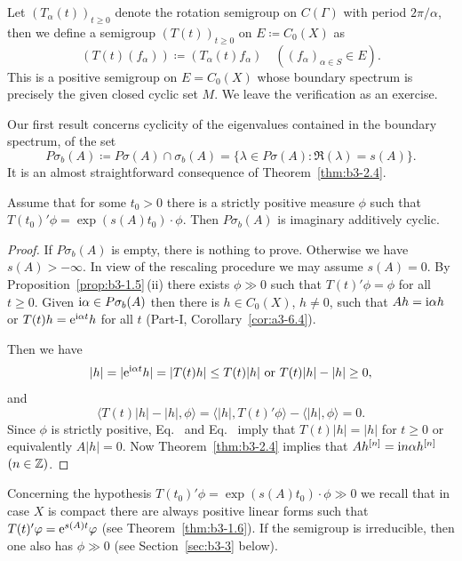 \begin{examples}
\begin{enumerate}[\upshape (i), wide, labelindent=.25em]
Let $(T_{\alpha}(t))_{t \geq 0}$ denote the rotation semigroup on $C(\Gamma)$ with period $2\pi/\alpha$, then we define a semigroup $(T(t))_{t \geq 0}$ on $E \coloneq C_{0}(X)$ as
	\[
	(T(t)(f_{\alpha})) \coloneq (T_{\alpha}(t)f_{\alpha}) \quad ((f_{\alpha})_{\alpha \in S} \in E).
	\]
	This is a positive semigroup on $E = C_{0}(X)$ whose boundary spectrum is precisely the given closed cyclic set $M$.
	We leave the verification as an exercise.
	
\end{enumerate}
\end{examples}
Our first result concerns cyclicity of the eigenvalues contained in the boundary spectrum, \ie of the set
	\[
	P\sigma_{b}(A) \coloneq P\sigma(A) \cap \sigma_{b}(A) = \{\lambda \in P\sigma(A) \colon \Re(\lambda)  = s(A)\}.
	\]
	It is an almost straightforward consequence of Theorem~\ref{thm:b3-2.4}.
	\begin{proposition}\label{prop:b3-2.7}
		
		Assume that for some $t_{0} > 0$ there is a strictly positive measure $\phi$ such that $T(t_{0})'\phi = \exp(s(A)t_{0})\cdot\phi$.
		Then $P\sigma_{b}(A)$ is imaginary additively cyclic.
	\end{proposition}
\begin{proof}
If\/ $P\sigma_{b}(A)$ is empty, there is nothing to prove.
Otherwise we have $s(A) > -\infty$.
In view of the rescaling procedure we may assume $s(A) = 0$.
By Proposition~\ref{prop:b3-1.5}\,(ii) there exists $\phi \gg 0$ such that $T(t)'\phi = \phi$ for all $t \geq 0$.
Given $\mathrm{i} \alpha \in P\sigma_{b}(A)$ then there is $h \in C_{0}(X)$, $h \neq 0$, such that $Ah = \mathrm{i}\alpha h$ or $T(t)h = \mathrm{e}^{\mathrm{i}\alpha t}h$ for all $t$ (Part-I, Corollary~\ref{cor:a3-6.4}).

	Then we have
	\begin{equation}\label{eq:b3-2.14}
		|h| = |\eu^{\im\alpha t}h| = |T(t)h| \leq T(t)|h| \text{ or } T(t)|h| - |h| \geq 0,
	\end{equation}
	and
	\begin{equation}\label{eq:b3-2.15}
		\langle T(t)|h| - |h|,\phi \rangle = \langle |h|,T(t)'\phi \rangle - \langle |h|,\phi \rangle = 0.
	\end{equation}
	Since $\phi$ is strictly positive, Eq.~  and Eq.~ imply that $T(t)|h| = |h|$ for $t \geq 0$ or equivalently $A|h| = 0$.
	Now Theorem~\ref{thm:b3-2.4} implies that $Ah^{[n]} = \mathrm{i} n\alpha h^{[n]}$ $(n \in \mathbb{Z})$.
\end{proof}
Concerning the hypothesis $T(t_{0})'\phi = \exp(s(A)t_{0})\cdot\phi \gg 0$ we recall that in case $X$ is compact there are always positive linear forms such that $T(t)'\phi = \eu^{s(A)t}\phi$ (see Theorem~\ref{thm:b3-1.6}).
If the semigroup is irreducible, then one also has $\phi \gg 0$ (see Section~\ref{sec:b3-3} below).

